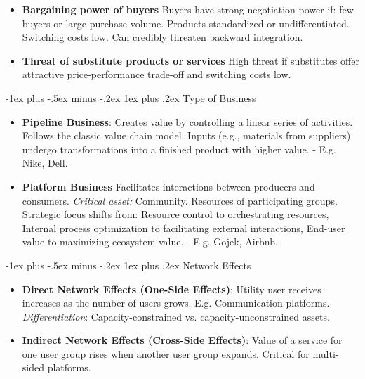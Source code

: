 \documentclass[12pt, landscape]{article}
\makeatletter
\renewcommand{\subsubsection}{\@startsection{subsubsection}{3}{0mm}%
                                {-1ex plus -.5ex minus -.2ex}%
                                {1ex plus .2ex}%
                                {\normalfont\small\bfseries}}
\makeatother
\begin{document}
\begin{multicols*}{3}
\begin{itemize}
    \item \textbf{Bargaining power of buyers}  
        Buyers have strong negotiation power if:  
           few buyers or large purchase volume.  
           Products standardized or undifferentiated.  
           Switching costs low.  
           Can credibly threaten backward integration.  

    \item \textbf{Threat of substitute products or services}  
        High threat if substitutes offer attractive price-performance trade-off and switching costs low.  
\end{itemize}

\subsubsection{Type of Business}
\begin{itemize}
    \item \textbf{Pipeline Business}: Creates value by controlling a linear series of activities. 
	Follows the classic value chain model.  Inputs (e.g., materials from suppliers) undergo transformations into a finished product with higher value.  
        - E.g. Nike, Dell.  

    \item \textbf{Platform Business}  
        Facilitates interactions between producers and consumers. 
        \textit{Critical asset:}  Community. Resources of participating groups.  
        Strategic focus shifts from: Resource control to orchestrating resources,
            Internal process optimization to facilitating external interactions,
            End-user value to maximizing ecosystem value.  
        - E.g. Gojek, Airbnb.  
\end{itemize}

\subsubsection{Network Effects}
\begin{itemize}
    \item \textbf{Direct Network Effects (One-Side Effects)}:
        Utility user receives increases as the number of users grows. E.g. Communication platforms.  
        \textit{Differentiation}: Capacity-constrained vs. capacity-unconstrained assets.  
    \item \textbf{Indirect Network Effects (Cross-Side Effects)}:
        Value of a service for one user group rises when another user group expands. Critical for multi-sided platforms.  
\end{itemize}



\end{multicols*}
\end{document}
